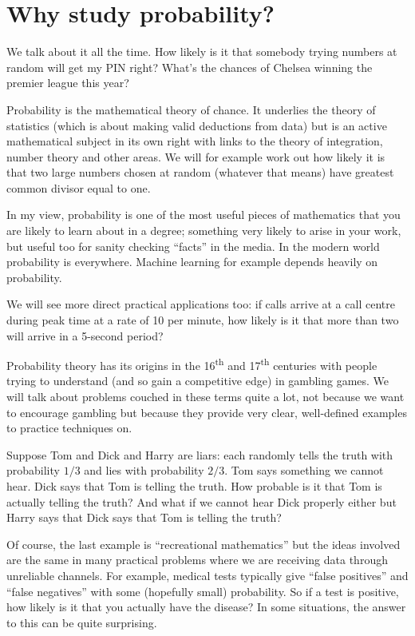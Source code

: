 \section{Why study probability?} 

We talk about it all the time. How likely is it that somebody trying numbers at random will get my PIN right? What's the chances of Chelsea winning the premier league this year?  

Probability is the mathematical theory of chance. It underlies the theory of statistics (which is about making valid deductions from data) but is an active mathematical subject in its own right with links to the theory of integration, number theory and other areas. We will for example work out how likely it is that two large numbers chosen at random (whatever that means) have greatest common divisor equal to one. 

In my view, probability is one of the most useful pieces of mathematics that you are likely to learn about in a degree; something very likely to arise in your work, but useful too for sanity checking ``facts'' in the media.  In the modern world probability is everywhere. Machine learning for example depends heavily on probability. 

We will see more direct practical applications too: if calls arrive at a call centre during peak time at a rate of 10 per minute, how likely is it that more than two will arrive in a 5-second period?  

Probability theory has its origins in the 16\textsuperscript{th} and 17\textsuperscript{th} centuries with people trying to understand (and so gain a competitive edge) in gambling games. We will talk about problems couched in these terms quite a lot, not because we want to encourage gambling but because they provide very clear, well-defined examples to practice techniques on. 

Suppose Tom and Dick and Harry are liars: each randomly tells the truth with probability $1/3$ and lies with probability $2/3$. Tom says something we cannot hear. Dick says that Tom is telling the truth.  How probable is it that Tom is actually telling the truth?   And what if we cannot hear Dick properly either but Harry says that Dick says that Tom is telling the truth?   
 
Of course, the last example is  ``recreational mathematics'' but the ideas involved are the same in many practical problems where we are receiving data through unreliable channels. For example, medical tests typically give ``false positives'' and ``false negatives'' with some (hopefully small) probability. So if a test is positive, how likely is it that you actually have the disease?  In some situations, the answer to this can be quite surprising. 